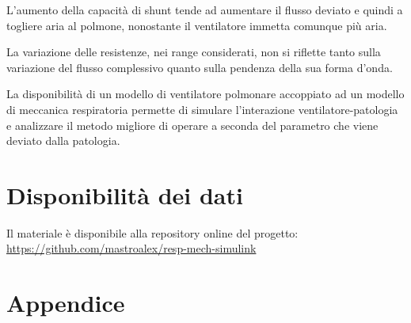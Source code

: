 L'aumento della capacità di shunt tende ad aumentare il flusso deviato e quindi a togliere aria al polmone, nonostante il ventilatore immetta comunque più aria.

La variazione delle resistenze, nei range considerati, non si riflette tanto sulla variazione del flusso complessivo quanto sulla pendenza della sua forma d'onda.

La disponibilità di un modello di ventilatore polmonare accoppiato ad un modello di meccanica respiratoria permette di simulare l'interazione ventilatore-patologia e analizzare il metodo migliore di operare a seconda del parametro che viene deviato dalla patologia. 

\section*{Disponibilità dei dati}

Il materiale è disponibile alla repository online del progetto: \url{https://github.com/mastroalex/resp-mech-simulink}


\raggedbottom
\printbibliography[title=Riferimenti]


\clearpage
\onecolumn
\section*{Appendice}

